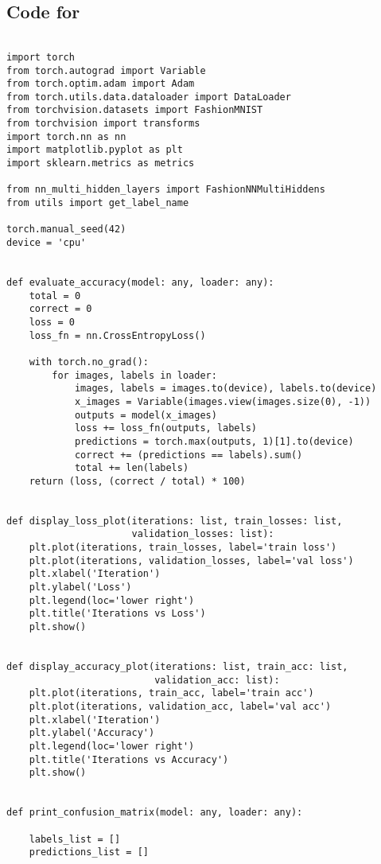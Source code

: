 \subsection{Code for }
\begin{verbatim}
    
import torch
from torch.autograd import Variable
from torch.optim.adam import Adam
from torch.utils.data.dataloader import DataLoader
from torchvision.datasets import FashionMNIST
from torchvision import transforms
import torch.nn as nn
import matplotlib.pyplot as plt
import sklearn.metrics as metrics

from nn_multi_hidden_layers import FashionNNMultiHiddens
from utils import get_label_name

torch.manual_seed(42)
device = 'cpu'


def evaluate_accuracy(model: any, loader: any):
    total = 0
    correct = 0
    loss = 0
    loss_fn = nn.CrossEntropyLoss()

    with torch.no_grad():
        for images, labels in loader:
            images, labels = images.to(device), labels.to(device)
            x_images = Variable(images.view(images.size(0), -1))
            outputs = model(x_images)
            loss += loss_fn(outputs, labels)
            predictions = torch.max(outputs, 1)[1].to(device)
            correct += (predictions == labels).sum()
            total += len(labels)
    return (loss, (correct / total) * 100)


def display_loss_plot(iterations: list, train_losses: list,
                      validation_losses: list):
    plt.plot(iterations, train_losses, label='train loss')
    plt.plot(iterations, validation_losses, label='val loss')
    plt.xlabel('Iteration')
    plt.ylabel('Loss')
    plt.legend(loc='lower right')
    plt.title('Iterations vs Loss')
    plt.show()


def display_accuracy_plot(iterations: list, train_acc: list,
                          validation_acc: list):
    plt.plot(iterations, train_acc, label='train acc')
    plt.plot(iterations, validation_acc, label='val acc')
    plt.xlabel('Iteration')
    plt.ylabel('Accuracy')
    plt.legend(loc='lower right')
    plt.title('Iterations vs Accuracy')
    plt.show()


def print_confusion_matrix(model: any, loader: any):

    labels_list = []
    predictions_list = []


\end{verbatim}
